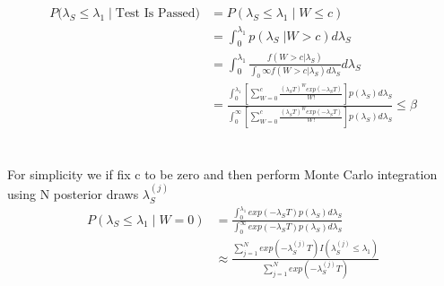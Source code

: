 \documentclass[12pt]{article}
\begin{document}
$$
\begin{aligned}
    P(\lambda_S \leq \lambda_1 \; \vert \; \text{Test Is Passed)} &= P(\lambda_S
    \leq \lambda_1 \; \vert \; W \leq c) \\ &= \int_{0}^{\lambda_1} p(\lambda_S \;
    \vert W > c) d\lambda_S \\ &= \int_{0}^{\lambda_1} \frac{f(W > c \vert
    \lambda_S)}{\int_{0}{\infty} f(W > c \vert \lambda_S) d\lambda_S} d\lambda_S \\ &=
    \frac{\int_{0}^{\lambda_1} [ \sum_{W=0}^c \frac{(\lambda_S T)^W
    exp(-\lambda_S T)}{W!}]p(\lambda_S)d\lambda_S} {\int_{0}^{\infty} [
    \sum_{W=0}^c \frac{(\lambda_S T)^W exp(-\lambda_S
    T)}{W!}]p(\lambda_S)d\lambda_S} \leq \beta
\end{aligned}
$$
\\
\\
For simplicity we if fix c to be zero and then perform Monte Carlo integration
using N posterior draws $ \lambda_S^{(j)} $ $$
\begin{aligned}
	 P(\lambda_S \leq \lambda_1 \; \vert \; W = 0) &= \frac{\int_{0}^{\lambda_1}
	 exp(-\lambda_S T)p(\lambda_S)d\lambda_S} {\int_{0}^{\infty} exp(-\lambda_S
	 T)p(\lambda_S)d\lambda_S} \\ &\approx \frac{\sum_{j = 1}^{N}
	 exp(-\lambda_S^{(j)} T)I(\lambda_S^{(j)} \leq \lambda_1)} {\sum_{j = 1}^{N}
	 exp(-\lambda_S^{(j)} T)}
\end{aligned}
$$
\end{document}
